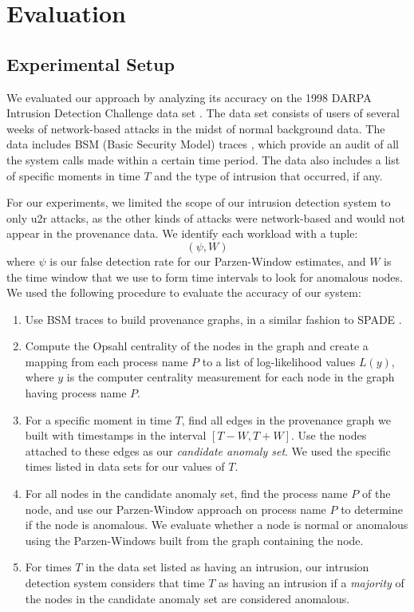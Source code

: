 \documentclass[10pt,twocolumn]{article}
\begin{document}
%

\section{Evaluation}

\subsection{Experimental Setup}

We evaluated our approach by analyzing its accuracy on the 1998 DARPA Intrusion Detection Challenge data set \cite{darpa}.
The data set consists of users of several weeks of network-based attacks in the midst of normal
background data. The data includes BSM (Basic Security Model) traces \cite{bsm}, which provide an
audit of all the system calls made within a certain time period. The data also includes a list
of specific moments in time $T$ and the type of intrusion that occurred, if any.

For our experiments, we limited the scope of our intrusion detection system to only u2r attacks, as
the other kinds of attacks were network-based and would not appear in the provenance data. 
We identify each workload with a tuple:
$$(\psi, W)$$
where $\psi$ is our false detection rate for our Parzen-Window
estimates, and $W$ is the time window that we use to form time intervals to look for anomalous nodes. We used
the following procedure to evaluate the accuracy of our system: 
\begin{enumerate}
\item Use BSM traces to build provenance graphs, in a similar fashion to SPADE \cite{spade}. 
\item Compute the Opsahl centrality of the nodes in the graph and create a mapping from each process
name $P$ to a list of log-likelihood values $L(y)$, where $y$ is the computer centrality measurement for each node in the graph having process name $P$.
\item For a specific moment in time $T$, find all edges in the provenance graph we built with timestamps in the interval $[T - W, T + W]$. 
Use the nodes attached to these edges as our {\em candidate anomaly set}. We used the specific times listed in data sets for our values of $T$.
\item For all nodes in the candidate anomaly set, find the process name $P$ of the node, and use our Parzen-Window approach on process
name $P$ to determine if the node is anomalous. We evaluate whether a node is normal or anomalous using the Parzen-Windows built from the graph
containing the node.
\item For times $T$ in the data set listed as having an intrusion, our intrusion detection system considers that time $T$ as having an intrusion
if a {\em majority} of the nodes in the candidate anomaly set are considered anomalous.
\end{enumerate}
\end{document}

